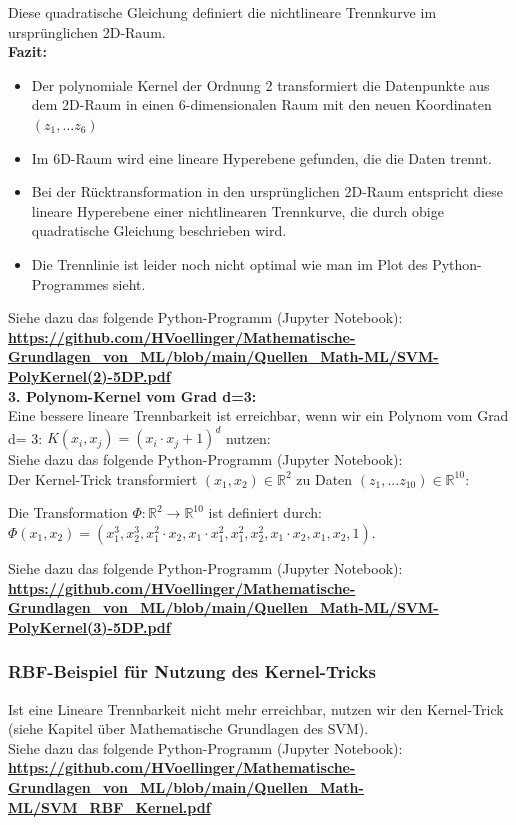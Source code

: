 \documentclass[12pt]{article}
\begin{document}
%
Diese quadratische Gleichung definiert die nichtlineare Trennkurve im ursprünglichen 2D-Raum.\\[0.2cm]
%
\textbf{Fazit:}
\begin{itemize}
    \item Der polynomiale Kernel der Ordnung 2 transformiert die Datenpunkte aus dem 2D-Raum in einen 6-dimensionalen Raum mit den neuen Koordinaten $ (z_1, ...z_6) $
    \item Im 6D-Raum wird eine lineare Hyperebene gefunden, die die Daten trennt.
    \item Bei der Rücktransformation in den ursprünglichen 2D-Raum entspricht diese lineare Hyperebene einer nichtlinearen Trennkurve, die durch obige quadratische Gleichung beschrieben wird.
   \item Die Trennlinie ist leider noch nicht optimal wie man im Plot des Python-Programmes sieht. 
\end{itemize}
%
Siehe dazu das folgende Python-Programm (Jupyter Notebook):\\[0.2cm]
\textbf{\url{https://github.com/HVoellinger/Mathematische-Grundlagen_von_ML/blob/main/Quellen_Math-ML/SVM-PolyKernel(2)-5DP.pdf}}\\[0.3cm]
\textbf{3. Polynom-Kernel vom Grad d=3:}\\
Eine bessere lineare Trennbarkeit ist erreichbar, wenn wir ein Polynom vom Grad d= 3: \( K(x_i, x_j) = (x_i \cdot x_j + 1)^d \) nutzen:\\[0.2cm]
Siehe dazu das folgende Python-Programm (Jupyter Notebook):\\
Der Kernel-Trick transformiert $ (x_1, x_2) \in \mathbb{R}^2$ zu  Daten $ (z_1, ... z_{10}) \in \mathbb{R}^{10} $: 
\begin{center}
 Die Transformation $\Phi:\mathbb{R}^2 \rightarrow\mathbb{R}^{10}$ ist definiert durch: \\[0.2cm]
$\Phi(x_1,x_2) = (x_1^3, x_2^3, x_1^2 \cdot x_2, x_1 \cdot x_1^2, x_1^2, x_2^2, x_1 \cdot x_2, x_1, x_2, 1)$. 
\end{center} 
Siehe dazu das folgende Python-Programm (Jupyter Notebook):\\[0.2cm]
\textbf{\url{https://github.com/HVoellinger/Mathematische-Grundlagen_von_ML/blob/main/Quellen_Math-ML/SVM-PolyKernel(3)-5DP.pdf}}

\subsubsection{RBF-Beispiel für Nutzung des Kernel-Tricks}
%
Ist eine Lineare Trennbarkeit nicht mehr erreichbar, nutzen wir den Kernel-Trick (siehe Kapitel über Mathematische Grundlagen des SVM).\\ 
Siehe dazu das folgende Python-Programm (Jupyter Notebook):\\[0.2cm]
\textbf{\url{https://github.com/HVoellinger/Mathematische-Grundlagen_von_ML/blob/main/Quellen_Math-ML/SVM_RBF_Kernel.pdf}} 
%
\end{document}
